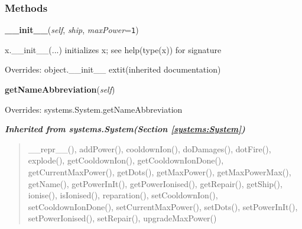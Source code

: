
  \subsubsection{Methods}

    \vspace{0.5ex}

\hspace{.8\funcindent}\begin{boxedminipage}{\funcwidth}

    \raggedright \textbf{\_\_init\_\_}(\textit{self}, \textit{ship}, \textit{maxPower}={\tt 1})

\setlength{\parskip}{2ex}
    x.\_\_init\_\_(...) initializes x; see help(type(x)) for signature

\setlength{\parskip}{1ex}
      Overrides: object.\_\_init\_\_ 	extit{(inherited documentation)}

    \end{boxedminipage}

    \vspace{0.5ex}

\hspace{.8\funcindent}\begin{boxedminipage}{\funcwidth}

    \raggedright \textbf{getNameAbbreviation}(\textit{self})

\setlength{\parskip}{2ex}
\setlength{\parskip}{1ex}
      Overrides: systems.System.getNameAbbreviation

    \end{boxedminipage}


\large{\textbf{\textit{Inherited from systems.System\textit{(Section \ref{systems:System})}}}}

\begin{quote}
\_\_repr\_\_(), addPower(), cooldownIon(), doDamages(), dotFire(), explode(), getCooldownIon(), getCooldownIonDone(), getCurrentMaxPower(), getDots(), getMaxPower(), getMaxPowerMax(), getName(), getPowerInIt(), getPowerIonised(), getRepair(), getShip(), ionise(), isIonised(), reparation(), setCooldownIon(), setCooldownIonDone(), setCurrentMaxPower(), setDots(), setPowerInIt(), setPowerIonised(), setRepair(), upgradeMaxPower()
\end{quote}


